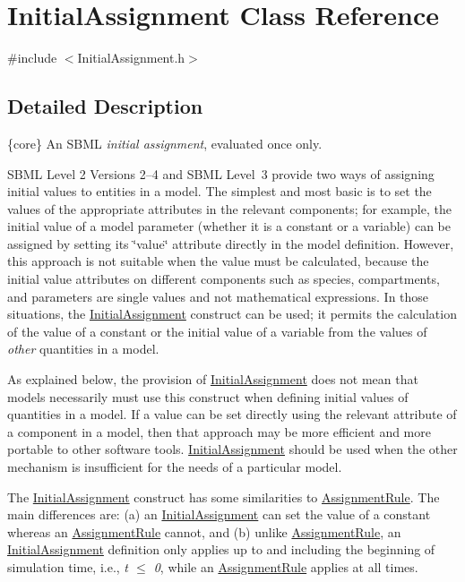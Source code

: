 \hypertarget{class_initial_assignment}{}\section{Initial\+Assignment Class Reference}
\label{class_initial_assignment}


{\ttfamily \#include $<$Initial\+Assignment.\+h$>$}



\subsection{Detailed Description}
\{core\} An S\+B\+ML {\itshape initial assignment}, evaluated once only.

S\+B\+ML Level 2 Versions 2--4 and S\+B\+ML Level~3 provide two ways of assigning initial values to entities in a model. The simplest and most basic is to set the values of the appropriate attributes in the relevant components; for example, the initial value of a model parameter (whether it is a constant or a variable) can be assigned by setting its \char`\"{}value\char`\"{} attribute directly in the model definition. However, this approach is not suitable when the value must be calculated, because the initial value attributes on different components such as species, compartments, and parameters are single values and not mathematical expressions. In those situations, the \hyperlink{class_initial_assignment}{Initial\+Assignment} construct can be used; it permits the calculation of the value of a constant or the initial value of a variable from the values of {\itshape other} quantities in a model.

As explained below, the provision of \hyperlink{class_initial_assignment}{Initial\+Assignment} does not mean that models necessarily must use this construct when defining initial values of quantities in a model. If a value can be set directly using the relevant attribute of a component in a model, then that approach may be more efficient and more portable to other software tools. \hyperlink{class_initial_assignment}{Initial\+Assignment} should be used when the other mechanism is insufficient for the needs of a particular model.

The \hyperlink{class_initial_assignment}{Initial\+Assignment} construct has some similarities to \hyperlink{class_assignment_rule}{Assignment\+Rule}. The main differences are\+: (a) an \hyperlink{class_initial_assignment}{Initial\+Assignment} can set the value of a constant whereas an \hyperlink{class_assignment_rule}{Assignment\+Rule} cannot, and (b) unlike \hyperlink{class_assignment_rule}{Assignment\+Rule}, an \hyperlink{class_initial_assignment}{Initial\+Assignment} definition only applies up to and including the beginning of simulation time, i.\+e., {\itshape t $\leq$ 0}, while an \hyperlink{class_assignment_rule}{Assignment\+Rule} applies at all times.

